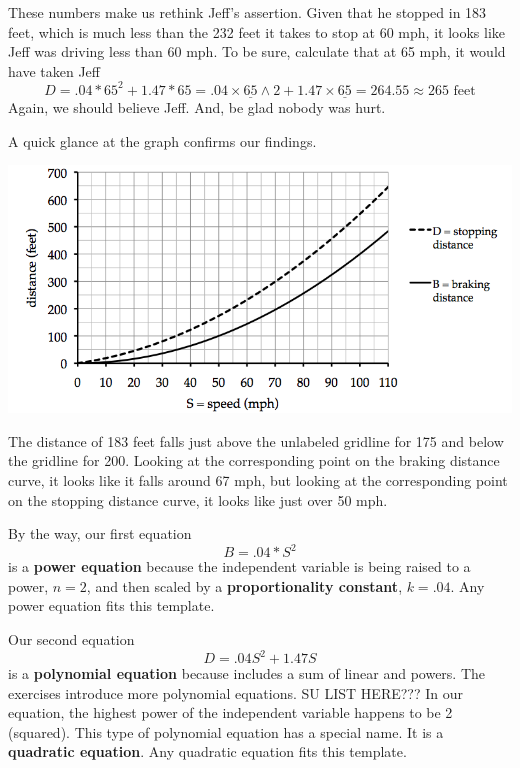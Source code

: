 These numbers make us rethink Jeff's assertion.  Given that he stopped in 183 feet, which is much less than the 232 feet it takes to stop at 60 mph, it looks like Jeff was driving less than 60 mph.  To be sure, calculate that at 65 mph, it would have taken Jeff
 $$D = .04 \ast  65^2 + 1.47 \ast  65  = .04\times \underline{65} \wedge 2+ 1.47\times \underline{65} =264.55 \approx 265 \text{ feet}$$  Again, we should believe Jeff.  And, be glad nobody was hurt.

A quick glance at the graph confirms our findings.  
\begin{center}
 {\includegraphics [width=7in] {cadillacBRAKESTOP.png}}
\end{center}
The distance of 183 feet falls just above the unlabeled gridline for 175 and below the gridline for 200.  Looking at the corresponding point on the braking distance curve, it looks like it falls around 67 mph, but looking at the corresponding point on the stopping distance curve, it looks like just over 50 mph.

By the way, our first equation $$B = .04 \ast S^2$$ is a \textbf{power equation} because the independent variable is being raised to a power, $n=2$, and then scaled by a \textbf{proportionality constant}, $k=.04$.  Any power equation fits this template.

\bigskip
\bigskip

\noindent Our second equation  $$D=.04S^2 + 1.47S$$ is a \textbf{polynomial equation} because includes a sum of linear and powers.  The exercises introduce more polynomial equations.  
SU LIST HERE???
In our equation, the highest power of the independent variable happens to be 2 (squared).  This type of polynomial equation has a special name.  It is a \textbf{quadratic equation}.  Any quadratic equation fits this template.

